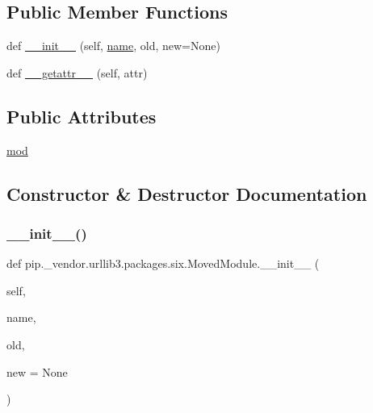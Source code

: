 \subsection*{Public Member Functions}
\begin{DoxyCompactItemize}
\item 
def \hyperlink{classpip_1_1__vendor_1_1urllib3_1_1packages_1_1six_1_1MovedModule_a040c7e0f3de6f0da751112c2dc5d3fb1}{\+\_\+\+\_\+init\+\_\+\+\_\+} (self, \hyperlink{classpip_1_1__vendor_1_1urllib3_1_1packages_1_1six_1_1__LazyDescr_ab59648d566d3274f298247937875a268}{name}, old, new=None)
\item 
def \hyperlink{classpip_1_1__vendor_1_1urllib3_1_1packages_1_1six_1_1MovedModule_a8514e7ecfc7139953cbf5a4c8f9f212b}{\+\_\+\+\_\+getattr\+\_\+\+\_\+} (self, attr)
\end{DoxyCompactItemize}
\subsection*{Public Attributes}
\begin{DoxyCompactItemize}
\item 
\hyperlink{classpip_1_1__vendor_1_1urllib3_1_1packages_1_1six_1_1MovedModule_a1d42cf4dbd8a9115a236cde3470aa76e}{mod}
\end{DoxyCompactItemize}


\subsection{Constructor \& Destructor Documentation}
\mbox{\label{classpip_1_1__vendor_1_1urllib3_1_1packages_1_1six_1_1MovedModule_a040c7e0f3de6f0da751112c2dc5d3fb1}} 
\subsubsection{\texorpdfstring{\+\_\+\+\_\+init\+\_\+\+\_\+()}{\_\_init\_\_()}}
{\footnotesize\ttfamily def pip.\+\_\+vendor.\+urllib3.\+packages.\+six.\+Moved\+Module.\+\_\+\+\_\+init\+\_\+\+\_\+ (\begin{DoxyParamCaption}\item[{}]{self,  }\item[{}]{name,  }\item[{}]{old,  }\item[{}]{new = {\ttfamily None} }\end{DoxyParamCaption})}




